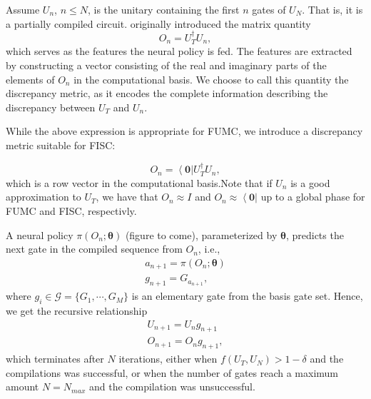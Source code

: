 \documentclass[%
 aip,
 floatfix,
 amsmath,amssymb,
 reprint,%
]{revtex4-1}
\newcommand{\bra}[1]{{\left\langle  #1 \right|}}
\begin{document}
Assume $U_n$, $n\leq N$, is the unitary containing the first $n$ gates of $U_N$. That is, it is a partially compiled circuit. \citet{QCRL} originally introduced the matrix quantity
\begin{equation}\label{eq:FUMCmetric}
    O_n = U_T^{\dagger}U_n,
\end{equation}
which serves as the features the neural policy is fed. The features are extracted by constructing a vector consisting of the real and imaginary parts of the elements of $O_n$ in the computational basis. We choose to call this quantity the discrepancy metric, as it encodes the complete information describing the discrepancy between $U_T$ and $U_n$. 

While the above expression is appropriate for FUMC, we introduce a discrepancy metric suitable for FISC:

\begin{equation}
    O_n = \bra{\boldsymbol{0}}U_T^{\dagger}U_n,
\end{equation}
which is a row vector in the computational basis.Note that if $U_n$ is a good approximation to $U_T$, we have that $O_n \approx I$ and $O_n \approx \bra{\boldsymbol{0}}$ up to a global phase for FUMC and FISC, respectivly.

A neural policy $\pi(O_n; \boldsymbol{\theta})$ (figure to come), parameterized by $\boldsymbol{\theta}$, predicts the next gate in the compiled sequence from $O_n$, i.e.,
\begin{align}
    a_{n+1} = \pi(O_n; \boldsymbol{\theta})\\
    g_{n+1} = G_{a_{n+1}},
\end{align}
where $g_i \in \mathcal{G} = \{G_1, \cdots, G_M\}$ is an elementary gate from the basis gate set. Hence, we get the recursive relationship
\begin{align}
    U_{n+1} = U_n g_{n+1}\\
    O_{n+1} = O_n g_{n+1},
\end{align}
which terminates after $N$ iterations, either when $f(U_T, U_N)> 1 - \delta$ and the compilations was successful, or when the number of gates reach a maximum amount $N=N_{max}$ and the compilation was unsuccessful. 
\end{document}
